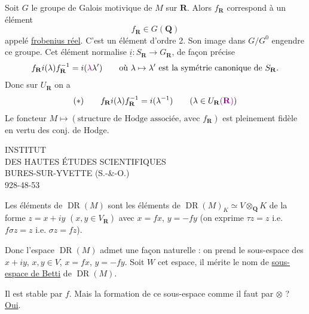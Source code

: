 Soit $G$ le groupe de Galois motivique de $M$ sur $\mathbf R$. Alors $f_{\mathbf R}$ correspond à un élément
\[
f_{\mathbf R}\in G(\mathbf Q)
\]
appelé \uline{frobenius réel}. C'est un élément d'ordre 2. Son image dans $G/G^0$ engendre ce groupe. Cet élément normalise $\underline i:S_{\mathbf R}\longrightarrow G_{\mathbf R}$, de façon précise
\[
f_{\mathbf R}i(\lambda)f_{\mathbf R}^{-1}=i(\deleted{\unsure{\lambda}}\lambda')
\qquad\text{où }\lambda\mapsto\lambda'\text{ est la symétrie canonique de }S_{\mathbf R}.
\]
Donc sur $U_{\mathbf R}$ on a
\[
(*)\qquad f_{\mathbf R}i(\lambda)f_{\mathbf R}^{-1}=i(\lambda^{-1})
\qquad (\lambda\in U_{\mathbf R}\deleted{\unsure{(\mathbf R)}})
\]
Le foncteur $M\mapsto(\text{structure de Hodge associée, avec }f_{\mathbf R})$ est pleinement fidèle en vertu des conj. de Hodge.


INSTITUT\\
DES HAUTES ÉTUDES SCIENTIFIQUES\\
BURES-SUR-YVETTE (S.-\&-O.)\\
928-48-53

Les éléments de $\operatorname{DR}(M)$ sont les éléments de $\operatorname{DR}(M)_K\simeq V\otimes_{\mathbf Q}K$ de la forme $z=x+iy$ $(x,y\in V_{\mathbf R})$ avec $x=fx$, $y=-fy$ (on exprime $\tau z=z$ i.e. $f\sigma z=z$ i.e. $\sigma z=fz$).

 Donc l'espace $\operatorname{DR}(M)$ admet une  façon naturelle  : on prend le sous-espace des $x+iy$, $x,y\in V$, $x=fx$, $y=-fy$. Soit $W$ cet espace, il mérite le nom de \uline{sous-espace de Betti}  de $\operatorname{DR}(M)$.

Il est stable par $f$. Mais la formation de ce sous-espace  comme il faut par $\otimes$ ? \uline{Oui}.


